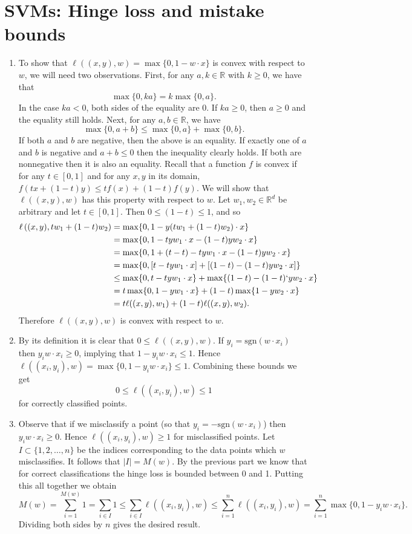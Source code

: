 \documentclass{article}
\newcommand{\R}{\mathbb{R}}
\begin{document}
\section{SVMs: Hinge loss and mistake bounds}
\begin{enumerate}
	\item To show that $\ell((x,y),w)=\max\{0,1-w\cdot x\}$ is convex with respect to $w$, we will need two observations. First, for any $a,k\in\R$ with $k\geq 0$, we have that
	\[
		\max\{0,ka\} = k\max\{0,a\}.
	\]
	In the case $ka<0$, both sides of the equality are 0. If $ka\geq 0$, then $a\geq0$ and the equality still holds. Next, for any $a,b\in\R$, we have
	\[
		\max\{0,a+b\}\leq \max\{0,a\}+\max\{0,b\}.
	\]
	If both $a$ and $b$ are negative, then the above is an equality. If exactly one of $a$ and $b$ is negative and $a+b\leq0$ then the inequality clearly holds. If both are nonnegative then it is also an equality.
	\vskip 0.1cm
	Recall that a function $f$ is convex if for any $t\in[0,1]$ and for any $x,y$ in its domain, $f(tx+(1-t)y)\leq tf(x)+(1-t)f(y)$. We will show that $\ell((x,y),w)$ has this property with respect to $w$. Let $w_1,w_2\in\R^d$ be arbitrary and let $t\in[0,1]$. Then $0\leq(1-t)\leq1$, and so
	\begin{align*}
		\ell\left((x,y),tw_1+(1-t)w_2\right) &= \max\{0,1-y(tw_1+(1-t)w_2)\cdot x\}\\
		&= \max\{0,1-tyw_1\cdot x-(1-t)yw_2\cdot x \}\\
		&= \max\{0,1+(t-t)-tyw_1\cdot x-(1-t)yw_2\cdot x \}\\
		&= \max\{0,[t-tyw_1\cdot x] + [(1-t)-(1-t)yw_2\cdot x] \}\\
		&\leq \max\{0,t-tyw_1\cdot x\}+\max\{(1-t)-(1-t)`yw_2\cdot x \}\\
		&= t\max\{0,1-yw_1\cdot x\}+(1-t)\max\{1-yw_2\cdot x \}\\
		&= t\ell((x,y),w_1)+(1-t)\ell((x,y),w_2).
	\end{align*}
	Therefore $\ell((x,y),w)$ is convex with respect to $w$.
	\item By its definition it is clear that $0\leq\ell((x,y),w)$. If $y_i=\mathrm{sgn}(w\cdot x_i)$ then $y_iw\cdot x_i\geq 0$, implying that $1- y_iw\cdot x_i\leq 1$. Hence $\ell((x_i,y_i),w)=\max\{0,1-y_iw\cdot x_i\}\leq 1$. Combining these bounds we get
	\[
		0\leq \ell((x_i,y_i),w)\leq 1
	\]
	for correctly classified points.
	\item Observe that if we misclassify a point (so that $y_i=-\mathrm{sgn}(w\cdot x_i)$) then $y_iw\cdot x_i\geq0$. Hence $\ell((x_i,y_i),w)\geq 1$ for misclassified points. Let $I\subset \{1,2,\dots,n\}$ be the indices corresponding to the data points which $w$ misclassifies. It follows that $|I|=M(w)$. By the previous part we know that for correct classifications the hinge loss is bounded between 0 and 1. Putting this all together we obtain
	\[
		M(w) = \sum_{i=1}^{M(w)}1 = \sum_{i\in I}1 \leq \sum_{i\in I}\ell((x_i,y_i),w)\leq\sum^n_{i=1}\ell((x_i,y_i),w)= \sum^n_{i=1}\max\{0,1-y_iw\cdot x_i\}.
	\]
	Dividing both sides by $n$ gives the desired result.
\end{enumerate}
\end{document}
